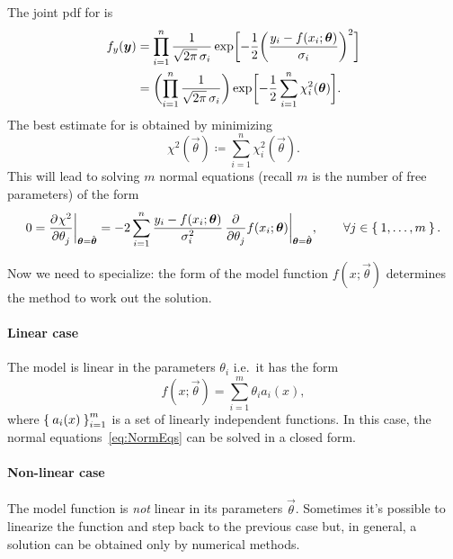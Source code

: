 \documentclass[
	10pt,
	draft
]{scrreprt}
\newcommand{\pderiv}[3][]{\dfrac{{\de^{#1}}#2}{\de #3^{#1}}}%
\begin{document}
The joint \ac{pdf} for  is
\begin{equation}
\begin{aligned}
f_{y}(\vec{y}) &= \prod_{i=1}^n \frac{1}{\sqrt{2\pi}\,\sigma_i}
\exp\qp[\bigg]{%
-\frac{1}{2} \tp[\bigg]{%
\frac{y_i - f(x_i;\vec{\theta})}{\sigma_i}
}^2
}\\
&=
 \tp[\bigg]{%
\prod_{i=1}^n
\frac{1}{\sqrt{2\pi}\,\sigma_i}
}
\exp\qp[\bigg]{%
-\frac{1}{2} \sum_{i=1}^n\chi^2_i(\vec{\theta})
}.
\end{aligned}
\end{equation}
The best estimate for \vec{\theta} is obtained by minimizing
\begin{equation}
\chi^2(\vec{\theta}) \coloneqq\sum_{i=1}^n\chi^2_i(\vec{\theta}).
\end{equation}
This will lead to solving $m$ normal equations (recall $m$ is the number of free parameters) of the form
\begin{equation}\label{eq:NormEqs}
0 = \pderiv{\chi^2}{\theta_j}\bigg\rvert_{\vec{\theta}=\hat{\vec{\theta}}}
=
-2
\sum_{i=1}^n \frac{y_i - f(x_i;\vec{\theta})}{\sigma_i^2}\,\pderiv{}{\theta_j}f(x_i;\vec{\theta})\bigg\rvert_{\vec{\theta} =\hat{\vec{\theta}}},
\qquad
\forall j\in\Set{1,\dots,m}.
\end{equation}


Now we need to specialize: the form of the model function $f(x;\vec{\theta})$ determines the method to work out the solution.

			\paragraph{Linear case}
The model is linear in the parameters $\theta_i$ i.e.~it has the form
\begin{equation}
f(x;\vec{\theta}) = \sum_{i=1}^m \theta_ia_i(x),
\end{equation}
where $\Set{a_i(x)}_{i=1}^m$ is a set of linearly independent functions.
In this case, the normal equations~\eqref{eq:NormEqs} can be solved in a closed form.



			\paragraph{Non-linear case}
The model function is \emph{not} linear in its parameters $\vec{\theta}$.
Sometimes it's possible to linearize the function and step back to the previous case but, in general, a solution can be obtained only by numerical methods.
\end{document}
